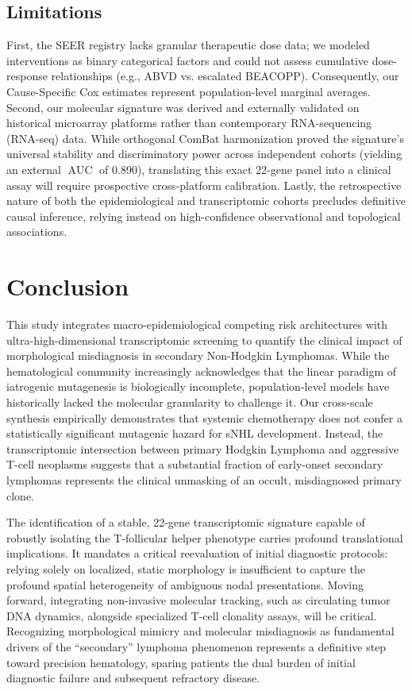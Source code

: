 \documentclass[a4paper,11pt,twocolumn]{article}
\begin{document}
	\subsection{Limitations}
	First, the SEER registry lacks granular therapeutic dose data; we modeled interventions as binary categorical factors and could not assess cumulative dose-response relationships (e.g., ABVD vs. escalated BEACOPP). Consequently, our Cause-Specific Cox estimates represent population-level marginal averages. Second, our molecular signature was derived and externally validated on historical microarray platforms rather than contemporary RNA-sequencing (RNA-seq) data. While orthogonal ComBat harmonization proved the signature's universal stability and discriminatory power across independent cohorts (yielding an external $\operatorname{AUC}$ of 0.890), translating this exact 22-gene panel into a clinical assay will require prospective cross-platform calibration. Lastly, the retrospective nature of both the epidemiological and transcriptomic cohorts precludes definitive causal inference, relying instead on high-confidence observational and topological associations.
	
	\section{Conclusion}
	
	This study integrates macro-epidemiological competing risk architectures with ultra-high-dimensional transcriptomic screening to quantify the clinical impact of morphological misdiagnosis in secondary Non-Hodgkin Lymphomas. While the hematological community increasingly acknowledges that the linear paradigm of iatrogenic mutagenesis is biologically incomplete, population-level models have historically lacked the molecular granularity to challenge it. Our cross-scale synthesis empirically demonstrates that systemic chemotherapy does not confer a statistically significant mutagenic hazard for sNHL development. Instead, the transcriptomic intersection between primary Hodgkin Lymphoma and aggressive T-cell neoplasms suggests that a substantial fraction of early-onset secondary lymphomas represents the clinical unmasking of an occult, misdiagnosed primary clone.
	
	The identification of a stable, 22-gene transcriptomic signature capable of robustly isolating the T-follicular helper phenotype carries profound translational implications. It mandates a critical reevaluation of initial diagnostic protocols: relying solely on localized, static morphology is insufficient to capture the profound spatial heterogeneity of ambiguous nodal presentations. Moving forward, integrating non-invasive molecular tracking, such as circulating tumor DNA dynamics, alongside specialized T-cell clonality assays, will be critical. Recognizing morphological mimicry and molecular misdiagnosis as fundamental drivers of the ``secondary'' lymphoma phenomenon represents a definitive step toward precision hematology, sparing patients the dual burden of initial diagnostic failure and subsequent refractory disease.
	
\end{document}
